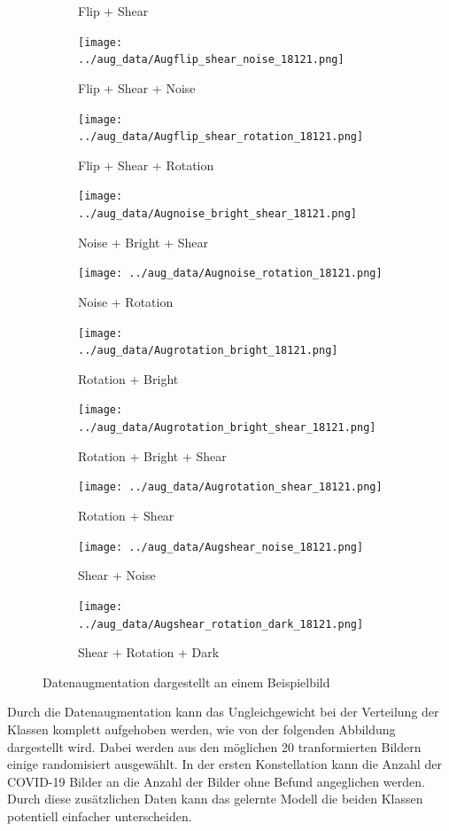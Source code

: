 \begin{figure}[H]
\begin{subfigure}[t]{0.2\textwidth}
		\caption{Flip + Shear}
	\end{subfigure} \hfill
	\begin{subfigure}[t]{0.2\textwidth}
		\texttt{[image: ../aug\_data/Augflip\_shear\_noise\_18121.png]}
		\caption{Flip + Shear + Noise}
	\end{subfigure} \hfill
	\begin{subfigure}[t]{0.2\textwidth}
		\texttt{[image: ../aug\_data/Augflip\_shear\_rotation\_18121.png]}
		\caption{Flip + Shear + Rotation}
	\end{subfigure} \hfill
	\begin{subfigure}[t]{0.2\textwidth}
		\texttt{[image: ../aug\_data/Augnoise\_bright\_shear\_18121.png]}
		\caption{Noise + Bright + Shear}
	\end{subfigure} \hfill
	\begin{subfigure}[t]{0.2\textwidth}
		\texttt{[image: ../aug\_data/Augnoise\_rotation\_18121.png]}
		\caption{Noise + Rotation}
	\end{subfigure} \hfill
	\begin{subfigure}[t]{0.2\textwidth}
		\texttt{[image: ../aug\_data/Augrotation\_bright\_18121.png]}
		\caption{Rotation + Bright}
	\end{subfigure} \hfill
	\begin{subfigure}[t]{0.2\textwidth}
		\texttt{[image: ../aug\_data/Augrotation\_bright\_shear\_18121.png]}
		\caption{Rotation + Bright + Shear}
	\end{subfigure} \hfill
	\begin{subfigure}[t]{0.2\textwidth}
		\texttt{[image: ../aug\_data/Augrotation\_shear\_18121.png]}
		\caption{Rotation + Shear}
	\end{subfigure} \hfill
	\begin{subfigure}[t]{0.2\textwidth}
		\texttt{[image: ../aug\_data/Augshear\_noise\_18121.png]}
		\caption{Shear + Noise}
	\end{subfigure} \hfill
	\begin{subfigure}[t]{0.2\textwidth}
		\texttt{[image: ../aug\_data/Augshear\_rotation\_dark\_18121.png]}
		\caption{Shear + Rotation + Dark}
	\end{subfigure} \hfill
	\caption{Datenaugmentation dargestellt an einem Beispielbild}
	\label{fig:augmentation}
\end{figure}

Durch die Datenaugmentation kann das Ungleichgewicht bei der Verteilung der Klassen komplett aufgehoben werden, wie von der folgenden Abbildung dargestellt wird.
Dabei werden aus den möglichen 20 tranformierten Bildern einige randomisiert ausgewählt.
In der ersten Konstellation kann die Anzahl der COVID-19 Bilder an die Anzahl der Bilder ohne Befund angeglichen werden. Durch diese zusätzlichen Daten kann das gelernte Modell die beiden Klassen potentiell einfacher unterscheiden.

